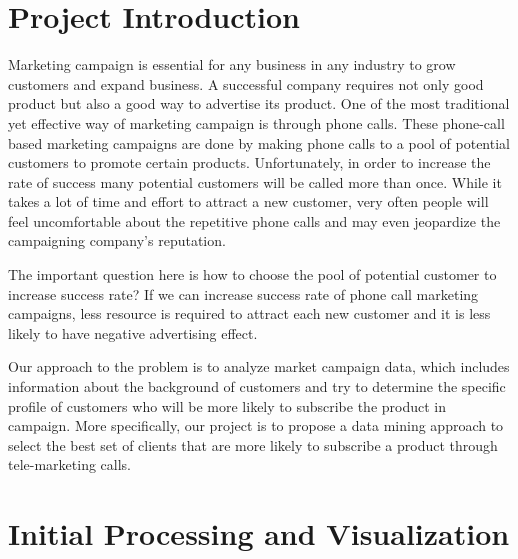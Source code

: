 \documentclass[forprint]{mytemplate}
\begin{document}
\setcounter{page}{1}
\setlength\parindent{0em}
\columnsep=20pt
\begin{multicols}{2}
\tableofcontents
\section{\color{blue} Project Introduction}
Marketing campaign is essential for any business in any industry to grow customers and expand business. A successful company requires not only good product but also a good way to advertise its product. One of the most traditional yet effective way of marketing campaign is through phone calls. These phone-call based marketing campaigns are done by making phone calls to a pool of potential customers to promote certain products. Unfortunately, in order to increase the rate of success many potential customers will be called more than once. While it takes a lot of time and effort to attract a new customer, very often people will feel uncomfortable about the repetitive phone calls and may even jeopardize the campaigning company’s reputation.

The important question here is how to choose the pool of potential customer to increase success rate? If we can increase
success rate of phone call marketing campaigns, less resource is required to attract each new customer and it is less likely
to have negative advertising effect.

Our approach to the problem is to analyze market campaign data, which includes information about the background of customers and try to determine the specific profile of customers who will be more likely to subscribe the product in campaign. More specifically, our project is to propose a data mining approach to select the best set of clients that are more likely to subscribe a product through tele-marketing calls.

\section{\color{blue}Initial Processing and Visualization}

\end{multicols}
\end{document}

